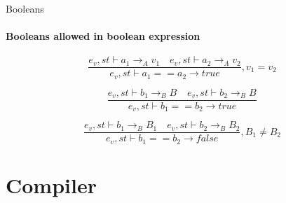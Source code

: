 \begin{frame}{Booleans}
\framesubtitle{Booleans allowed in boolean expression}
\begin{equation}
	\frac { { e }_{ v },st\vdash { a }_{ 1 }{ \rightarrow  }_{ A }{ v }_{ 1 }\quad { e }_{ v },st\vdash { a }_{ 2 }{ \rightarrow  }_{ A }{ v }_{ 2 } }{ { e }_{ v },st\vdash { a }_{ 1 }=={ a }_{ 2 }{ \rightarrow  }true } ,{ v }_{ 1 }={ v }_{ 2 }
\end{equation}

\begin{equation}
	\frac { { e }_{ v },st\vdash { b }_{ 1 }{ \rightarrow  }_{ B }{ B }_{  }\quad { e }_{ v },st\vdash { b }_{ 2 }{ \rightarrow  }_{ B }{ B }_{  } }{ { e }_{ v },st\vdash { b }_{ 1 }=={ b }_{ 2 }{ \rightarrow  }true } 
\end{equation}

\begin{equation}
	\frac { { e }_{ v },st\vdash { b }_{ 1 }{ \rightarrow  }_{ B }{ B }_{ 1 }\quad { e }_{ v },st\vdash { b }_{ 2 }{ \rightarrow  }_{ B }{ B }_{ 2 } }{ { e }_{ v },st\vdash { b }_{ 1 }=={ b }_{ 2 }{ \rightarrow  }false } , { B }_{ 1 } \neq { B }_{ 2 } 
\end{equation}
\end{frame}

\section{Compiler}
